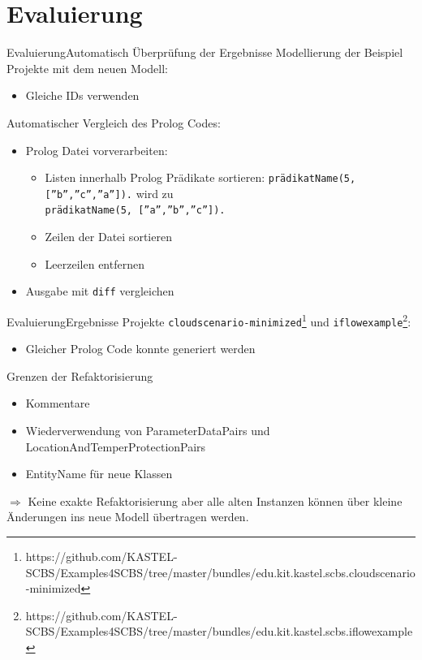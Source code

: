 \documentclass{sdqbeamer}
\begin{document}
\section{Evaluierung}
\begin{frame}{Evaluierung}{Automatisch Überprüfung der Ergebnisse}
	Modellierung der Beispiel Projekte mit dem neuen Modell:
	\begin{itemize}
		\item Gleiche IDs verwenden
	\end{itemize}
\vspace{0.05\textheight}
	Automatischer Vergleich des Prolog Codes:
	\begin{itemize}
		\item Prolog Datei vorverarbeiten:
		\begin{itemize}
			\item Listen innerhalb Prolog Prädikate sortieren:
			\hspace{0.05\textwidth}\texttt{prädikatName(5, [''b'',''c'',''a'']).} wird zu \\ \hspace{0.408\textwidth} \texttt{prädikatName(5, [''a'',''b'',''c'']).}
			\item Zeilen der Datei sortieren
			\item Leerzeilen entfernen
		\end{itemize}
		\item Ausgabe mit \texttt{diff} vergleichen
	\end{itemize}
\end{frame}
\begin{frame}{Evaluierung}{Ergebnisse}
		Projekte \texttt{cloudscenario-minimized}\footnote{https://github.com/KASTEL-SCBS/Examples4SCBS/tree/master/bundles/edu.kit.kastel.scbs.cloudscenario-minimized} und \texttt{iflowexample}\footnote{https://github.com/KASTEL-SCBS/Examples4SCBS/tree/master/bundles/edu.kit.kastel.scbs.iflowexample}:
		\begin{itemize}
			\item Gleicher Prolog Code konnte generiert werden
		\end{itemize}
		\vspace{0.05\textheight}
		Grenzen der Refaktorisierung
		\begin{itemize}
			\item Kommentare
			\item Wiederverwendung von ParameterDataPairs und LocationAndTemperProtectionPairs
			\item EntityName für neue Klassen
		\end{itemize}
	$\Rightarrow$ Keine exakte Refaktorisierung aber alle alten Instanzen können über kleine Änderungen ins neue Modell übertragen werden.
\end{frame}

\appendix
\beginbackup
\backupend
\end{document}
